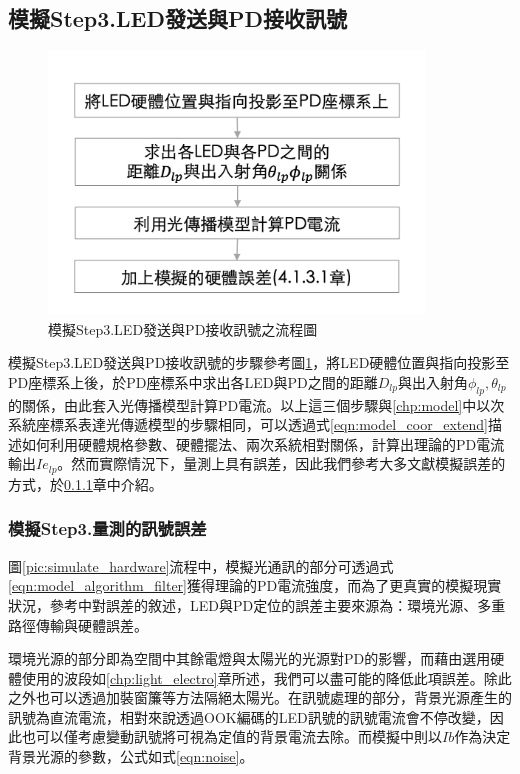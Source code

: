 \subsection{模擬Step3.LED發送與PD接收訊號}
\label{chp:simulate_vlc}

    \begin{figure}[htpb]
        \centering
        \includegraphics[width=10cm]{ch4pic/simulate_signal_flow.png}
        \caption{模擬Step3.LED發送與PD接收訊號之流程圖}
        \label{pic:simulate_signal_flow}
    \end{figure}

    模擬Step3.LED發送與PD接收訊號的步驟參考圖\ref{pic:simulate_signal_flow}，將LED硬體位置與指向投影至PD座標系上後，於PD座標系中求出各LED與PD之間的距離$D_{lp}$與出入射角$\phi_{lp},\theta_{lp}$的關係，由此套入光傳播模型計算PD電流。以上這三個步驟與\ref{chp:model}中以次系統座標系表達光傳遞模型的步驟相同，可以透過式\ref{eqn:model_coor_extend}描述如何利用硬體規格參數、硬體擺法、兩次系統相對關係，計算出理論的PD電流輸出$Ie_{lp}$。然而實際情況下，量測上具有誤差，因此我們參考大多文獻模擬誤差的方式，於\ref{chp:hardware_error}章中介紹。

    \subsubsection{模擬Step3.量測的訊號誤差}
    \label{chp:hardware_error}

    圖\ref{pic:simulate_hardware}流程中，模擬光通訊的部分可透過式\ref{eqn:model_algorithm_filter}獲得理論的PD電流強度，而為了更真實的模擬現實狀況，參考\cite{survey_light2018}中對誤差的敘述，LED與PD定位的誤差主要來源為：環境光源、多重路徑傳輸與硬體誤差。
    
    環境光源的部分即為空間中其餘電燈與太陽光的光源對PD的影響，而藉由選用硬體使用的波段如\ref{chp:light_electro}章所述，我們可以盡可能的降低此項誤差。除此之外也可以透過加裝窗簾等方法隔絕太陽光。在訊號處理的部分，背景光源產生的訊號為直流電流，相對來說透過OOK編碼的LED訊號的訊號電流會不停改變，因此也可以僅考慮變動訊號將可視為定值的背景電流去除。而模擬中則以$Ib$作為決定背景光源的參數，公式如式\ref{eqn:noise}。
    
